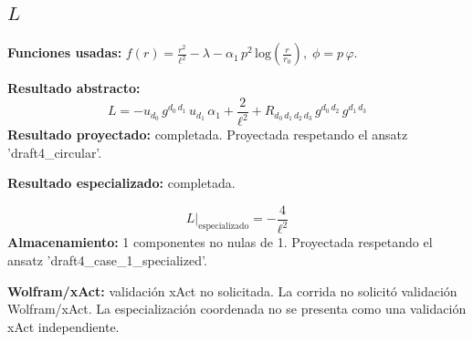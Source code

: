 \documentclass[11pt]{article}
\begin{document}
\subsection*{$ L $}
\textbf{Funciones usadas:} $ f\!\left(r\right) = \frac{{r}^{2}}{{\ell}^{2}} - \lambda - \alpha_{1}\,{p}^{2}\,\mathrm{log}\!\left(\frac{r}{r_{0}}\right),\;\phi=p\,\varphi $.\par
\textbf{Resultado abstracto:}
\begin{dmath*}[breakdepth={5}]
L = -u{}_{d_{0}}\,g{}^{d_{0}\,d_{1}}\,u{}_{d_{1}}\,\alpha_{1} + \frac{2}{{\ell}^{2}} + R{}_{d_{0}\,d_{1}\,d_{2}\,d_{3}}\,g{}^{d_{0}\,d_{2}}\,g{}^{d_{1}\,d_{3}}
\end{dmath*}
\textbf{Resultado proyectado:} completada. Proyectada respetando el ansatz 'draft4\_circular'.\par
\textbf{Resultado especializado:} completada.\par
\begin{dmath*}[breakdepth={5}]
L\big|_{\mathrm{especializado}} = -\frac{4}{{\ell}^{2}}
\end{dmath*}
\textbf{Almacenamiento:} 1 componentes no nulas de 1. Proyectada respetando el ansatz 'draft4\_case\_1\_specialized'.\par
\textbf{Wolfram/xAct:} validación xAct no solicitada. La corrida no solicitó validación Wolfram/xAct. La especialización coordenada no se presenta como una validación xAct independiente.\par\medskip
{}
\end{document}
